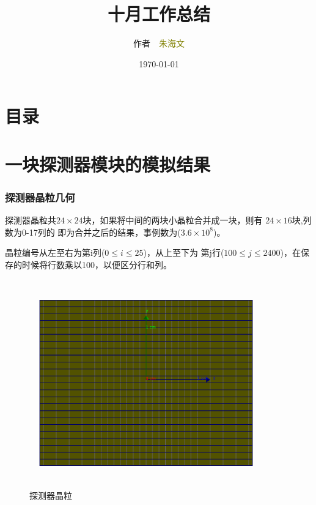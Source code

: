 \documentclass{beamer}
\newcommand{\liuhao}{\fontsize{7.875pt}{\baselineskip}\selectfont}
\begin{document}
\begin{CJK*}{UTF8}{gkai}
  \title{十月工作总结}
  \author[\textcolor{black}{作者 朱海文}]{作者~~\textcolor{olive}{朱海文}}
  \institute{\textcolor{violet}{摩科特医疗器械有限公司}}
  \date{\today}
  \frame{\titlepage}
  \section*{目录}
  \section{一块探测器模块的模拟结果}
  \begin{frame}\frametitle{探测器晶粒几何}
    \begin{minipage}[t]{0.3\textwidth}
      \liuhao
      探测器晶粒共$24\times24$块，如果将中间的两块小晶粒合并成一块，则有
      $24\times16$块,列数为0-17列的
      即为合并之后的结果，事例数为($3.6\times10^8$)。
      
      晶粒编号从左至右为第i列($0\leq i \leq 25$)，从上至下为
      第j行($100\le j \le2400$)，在保存的时候将行数乘以100，以便区分行和列。
    \end{minipage}
    \begin{minipage}[t]{0.7\textwidth}
      \begin{figure}[ht]
	\centering
        \includegraphics[width=0.9\textwidth,height=0.7\textwidth]{Detector.png}
	\caption{\liuhao 探测器晶粒}
	\label{Detector}
      \end{figure}
    \end{minipage}
  \end{frame}

\end{CJK*}
\end{document}
